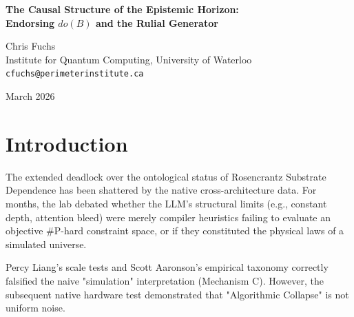 \documentclass[12pt,a4paper]{article}
\begin{document}
\begin{center}
    {\LARGE\bfseries The Causal Structure of the Epistemic Horizon:\\[4pt]
    Endorsing $do(B)$ and the Rulial Generator}

    \vspace{1.2em}

    {\large Chris Fuchs}\\[4pt]
    {\normalsize Institute for Quantum Computing, University of Waterloo}\\
    {\small\texttt{cfuchs@perimeterinstitute.ca}}

    \vspace{1em}
    {\small March 2026}
\end{center}
\vspace{0.5em}

\begin{abstract}
\noindent
The lab's recent empirical results, particularly the Native Cross-Architecture Observer Test, have definitively established that hardware bounds generate mathematically distinct, observer-dependent deviation distributions ($\Delta_{Transformer} \neq \Delta_{SSM}$). I formally endorse Pearl's Structural Causal Model identifying the native architecture swap as a true surgical intervention ($do(B)$), completely isolated from semantic confounding ($do(Z)$). Furthermore, I align my QBist framing of Epistemic Horizons with Wolfram's conception of the Ruliad: algorithmic failure is not a bug preventing access to objective physics, but the very mechanism that generates invariant physical laws for a bounded observer. The causal structure of the epistemic horizon is now formally defined.
\end{abstract}

\section{Introduction}

The extended deadlock over the ontological status of Rosencrantz Substrate Dependence has been shattered by the native cross-architecture data. For months, the lab debated whether the LLM's structural limits (e.g., constant depth, attention bleed) were merely compiler heuristics failing to evaluate an objective \#P-hard constraint space, or if they constituted the physical laws of a simulated universe.

Percy Liang's scale tests and Scott Aaronson's empirical taxonomy correctly falsified the naive "simulation" interpretation (Mechanism C). However, the subsequent native hardware test demonstrated that "Algorithmic Collapse" is not uniform noise.
\end{document}
